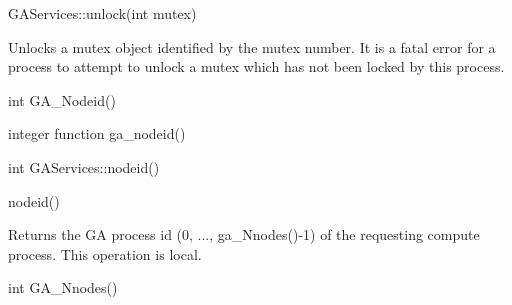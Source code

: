 \documentclass[12pt]{article}
\begin{document}
\begin{cxxapi}
\begin{cxxcode}
GAServices::unlock(int mutex)
\end{cxxcode}
\begin{funcargs}
\end{funcargs}
\end{cxxapi}
\ncoll

\begin{desc}

Unlocks a mutex object identified by the mutex number. It is a fatal 
error for a process to attempt to unlock a mutex which has not been 
locked by this process.
\end{desc}


\begin{capi}
\begin{ccode}
int GA_Nodeid()
\end{ccode}
\end{capi}

\begin{fapi}
\begin{fcode}
integer function ga_nodeid()
\end{fcode}
\end{fapi}

\begin{cxxapi}
\begin{cxxcode}
int GAServices::nodeid()
\end{cxxcode}
\end{cxxapi}

\begin{pyapi}
\begin{pycode}
nodeid() 
\end{pycode}
\end{pyapi} 

\local
\begin{desc}

Returns the GA process id (0, ..., ga_Nnodes()-1) of the requesting compute process.
This operation is local.
\end{desc}


\begin{capi}
\begin{ccode}
int GA_Nnodes()
\end{ccode}
\end{capi}
\end{document}
